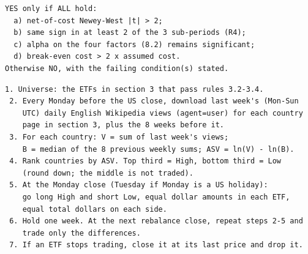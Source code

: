 \begin{Verbatim}[fontsize=\footnotesize, frame=single, framerule=0.3pt, rulecolor=\color{black!35}, framesep=2.5mm, samepage=true, label={\textcolor{black}{\textbf{11. DECISION RULE: WOULD I TRADE IT WITH REAL CAPITAL?}}}]
YES only if ALL hold:
  a) net-of-cost Newey-West |t| > 2;
  b) same sign in at least 2 of the 3 sub-periods (R4);
  c) alpha on the four factors (8.2) remains significant;
  d) break-even cost > 2 x assumed cost.
Otherwise NO, with the failing condition(s) stated.
\end{Verbatim}

\begin{Verbatim}[fontsize=\footnotesize, frame=single, framerule=0.3pt, rulecolor=\color{black!35}, framesep=2.5mm, samepage=true, label={\textcolor{black}{\textbf{12. EXECUTABLE STRATEGY (for a colleague, no questions needed)}}}]
 1. Universe: the ETFs in section 3 that pass rules 3.2-3.4.
 2. Every Monday before the US close, download last week's (Mon-Sun
    UTC) daily English Wikipedia views (agent=user) for each country
    page in section 3, plus the 8 weeks before it.
 3. For each country: V = sum of last week's views;
    B = median of the 8 previous weekly sums; ASV = ln(V) - ln(B).
 4. Rank countries by ASV. Top third = High, bottom third = Low
    (round down; the middle is not traded).
 5. At the Monday close (Tuesday if Monday is a US holiday):
    go long High and short Low, equal dollar amounts in each ETF,
    equal total dollars on each side.
 6. Hold one week. At the next rebalance close, repeat steps 2-5 and
    trade only the differences.
 7. If an ETF stops trading, close it at its last price and drop it.
\end{Verbatim}
